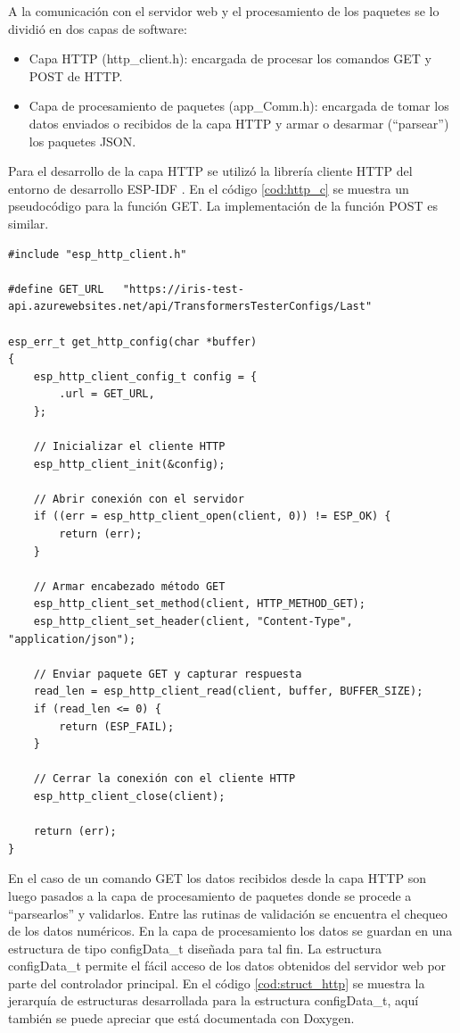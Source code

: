 A la comunicación con el servidor web y el procesamiento de los paquetes se lo dividió en dos capas de software:
\begin{itemize}
\item Capa HTTP (http\_client.h): encargada de procesar los comandos GET y POST de HTTP.
\item Capa de procesamiento de paquetes (app\_Comm.h): encargada de tomar los datos enviados o recibidos de la capa HTTP y armar o desarmar (``parsear'') los paquetes JSON.
\end{itemize}

Para el desarrollo de la capa HTTP se utilizó la librería cliente HTTP del entorno de desarrollo ESP-IDF \citep{HTTPC}. En el código \ref{cod:http_c} se muestra un pseudocódigo para la función GET. La implementación de la función POST es similar.

\begin{lstlisting}[label=cod:http_c,caption=Pseudocódigo función GET de HTTP.]
#include "esp_http_client.h"

#define GET_URL   "https://iris-test-api.azurewebsites.net/api/TransformersTesterConfigs/Last"

esp_err_t get_http_config(char *buffer)
{
    esp_http_client_config_t config = {
    	.url = GET_URL,
    };

    // Inicializar el cliente HTTP
    esp_http_client_init(&config);
    
    // Abrir conexión con el servidor
    if ((err = esp_http_client_open(client, 0)) != ESP_OK) {
        return (err);
    }
    
    // Armar encabezado método GET
    esp_http_client_set_method(client, HTTP_METHOD_GET);
    esp_http_client_set_header(client, "Content-Type", "application/json");
    
    // Enviar paquete GET y capturar respuesta
    read_len = esp_http_client_read(client, buffer, BUFFER_SIZE);
    if (read_len <= 0) {
        return (ESP_FAIL);
    }
    
    // Cerrar la conexión con el cliente HTTP
    esp_http_client_close(client);

    return (err);
}

\end{lstlisting}

En el caso de un comando GET los datos recibidos desde la capa HTTP son luego pasados a la capa de procesamiento de paquetes donde se procede a ``parsearlos'' y validarlos. Entre las rutinas de validación se encuentra el chequeo de los datos numéricos. En la capa de procesamiento los datos se guardan en una estructura de tipo configData\_t diseñada para tal fin. La estructura configData\_t permite el fácil acceso de los datos obtenidos del servidor web por parte del controlador principal. En el código \ref{cod:struct_http} se muestra la jerarquía de estructuras desarrollada para la estructura configData\_t, aquí también se puede apreciar que está documentada con Doxygen.

